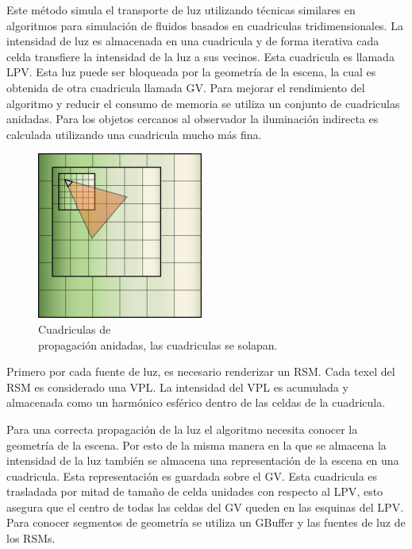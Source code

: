 Este método simula el transporte de luz utilizando técnicas similares en algoritmos para simulación de fluidos basados en cuadriculas \cite{Crane07} tridimensionales. La intensidad de luz es almacenada en una cuadricula y de forma iterativa cada celda transfiere la intensidad de la luz a sus vecinos. Esta cuadricula es llamada \ac{LPV}. Esta luz puede ser bloqueada por la geometría de la escena, la cual es obtenida de otra cuadricula llamada \ac{GV}. Para mejorar el rendimiento del algoritmo y reducir el consumo de memoria se utiliza un conjunto de cuadriculas anidadas. Para los objetos cercanos al observador la iluminación indirecta es calculada utilizando una cuadricula mucho más fina.

\begin{figure}
	\centering
	\includegraphics[width=0.90\linewidth]{media/g4957.png}
	\caption{Cuadriculas de \\ propagación anidadas, las cuadriculas se solapan.}
	\label{fig:nested_lpv}
\end{figure}

Primero por cada fuente de luz, es necesario renderizar un \ac{RSM}. Cada texel del \ac{RSM} es considerado una \ac{VPL}. La intensidad del \ac{VPL} es acumulada y almacenada como un harmónico esférico dentro de las celdas de la cuadricula.

Para una correcta propagación de la luz el algoritmo necesita conocer la geometría de la escena. Por esto de la misma manera en la que se almacena la intensidad de la luz también se almacena una representación de la escena en una cuadricula. Esta representación es guardada sobre el \ac{GV}. Esta cuadricula es trasladada por mitad de tamaño de celda unidades con respecto al \ac{LPV}, esto asegura que el centro de todas las celdas del \ac{GV} queden en las esquinas del \ac{LPV}. Para conocer segmentos de geometría se utiliza un \ac{GBuffer} y las fuentes de luz de los \ac{RSM}s.


